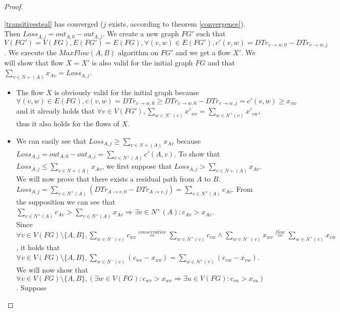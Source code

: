 \documentclass[11pt]{article}
\theoremstyle{definition}
\theoremstyle{corollary}
\theoremstyle{lemma}
\begin{document}
\begin{proof}
\begin{itemize}
          \ref{transitivesteal} has converged ($j$ exists, according to theorem \ref{convergence}). Then $Loss_{A, j} =
          out_{A, 0} - out_{A, j}$. We create a new graph $FG'$ such that $V(FG') = V(FG), E(FG') = E(FG), \forall (v, w) 
          \in E(FG'), c'(v,w) = DTr_{v \rightarrow w, 0} - DTr_{v \rightarrow w, j}$. We execute the $MaxFlow(A, B)$
          algorithm on $FG'$ and we get a flow $X'$. We will show that flow $X=X'$ is also valid for the initial graph
          $FG$ and that $\sum\limits_{v \in N{+}(A)}x_{Av} = Loss_{A,j}$.
          \begin{itemize}
             \item The flow $X$ is obviously valid for the initial graph because $\forall (v,w) \in E(FG), c(v,w) = DTr_{v
             \rightarrow w, 0} \geq DTr_{v \rightarrow w, 0} - DTr_{v \rightarrow w, j} = c'(v,w) \geq x_{vw}$ and it
             already holds that $\forall v \in V(FG'), \sum\limits_{w \in N^{-}(v)}x'_{wv} = \sum\limits_{w \in N^{+}(v)}
             x'_{vw}$, thus it also holds for the flows of $X$.
             \item We can easily see that $Loss_{A,j} \geq \sum\limits_{v \in N{+}(A)}x_{Av}$ because $Loss_{A,j} =
             out_{A,0} - out_{A,j} = \sum\limits_{v \in N^{+}(A)}c'(A,v)$. To show that $Loss_{A,j} \leq
             \sum\limits_{v \in N{+}(A)}x_{Av}$, we first suppose that $Loss_{A,j} > \sum\limits_{v \in N{+}(A)}x_{Av}$. We
             will now prove that there exists a residual path from $A$ to $B$. $Loss_{A,j} = \sum\limits_{v \in N^{+}(A)}
             (DTr_{A \rightarrow v, 0} - DTr_{A \rightarrow v, j}) = \sum\limits_{v \in N^{+}(A)}c_{Av}$. From the
             supposition we can see that $\sum\limits_{v \in N^{+}(A)}c_{Av} > \sum\limits_{v \in N^{+}(A)}x_{Av}
             \Rightarrow \exists v \in N^{+}(A) : c_{Av} > x_{Av}$. \\
             Since $\forall v \in V(FG) \setminus \{A,B\}, \sum\limits_{w \in N^{-}(v)}c_{wv} \overset{conservative}{=}
             \sum\limits_{w \in N^{+}(v)}c_{vw} \wedge \sum\limits_{w \in N^{-}(v)}x_{wv} \overset{flow}{=}
             \sum\limits_{w \in N^{+}(v)}x_{vw}$, it holds that $\forall v \in V(FG) \setminus \{A,B\}, \sum\limits_{w \in
             N^{-}(v)}(c_{wv} - x_{wv}) = \sum\limits_{w \in N^{+}(v)}(c_{vw} - x_{vw})$. \\
             We will now show that $\forall v \in V(FG) \setminus
             \{A,B\}, (\exists w \in V(FG) : c_{wv} > x_{wv} \Rightarrow \exists u \in V(FG) : c_{vu} > x_{vu})$. Suppose

\end{itemize}
\end{itemize}
\end{proof}
\end{document}
